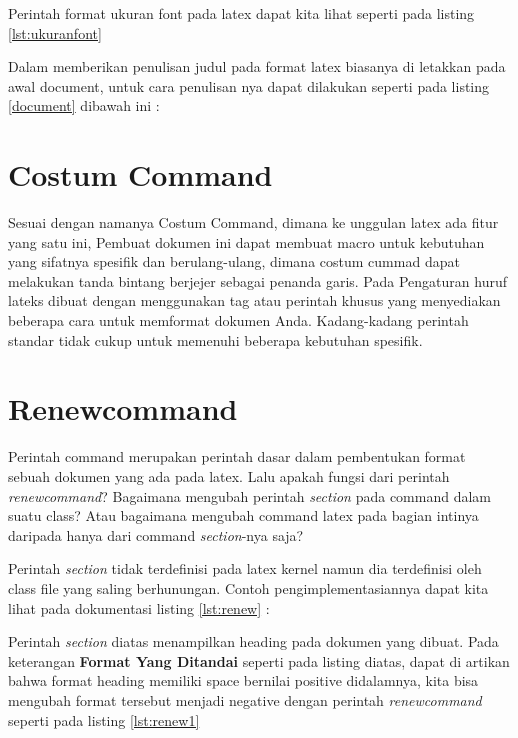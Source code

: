 Perintah format ukuran font pada latex dapat kita lihat seperti pada listing \ref{lst:ukuranfont}



Dalam memberikan penulisan judul pada format latex biasanya di letakkan pada awal document, untuk cara penulisan nya dapat dilakukan seperti pada listing  \ref{document} dibawah ini :



\section{Costum Command}
Sesuai  dengan  namanya Costum Command, dimana ke unggulan latex ada fitur yang satu ini, Pembuat dokumen ini dapat  membuat macro untuk kebutuhan yang sifatnya spesifik dan berulang-ulang, dimana costum cummad dapat melakukan tanda bintang berjejer sebagai penanda garis. Pada Pengaturan huruf lateks dibuat dengan menggunakan tag atau perintah khusus yang menyediakan beberapa cara untuk memformat dokumen Anda. Kadang-kadang perintah standar tidak cukup untuk memenuhi beberapa kebutuhan spesifik.

\section{Renewcommand}
Perintah command merupakan perintah dasar dalam pembentukan format sebuah dokumen yang ada pada latex. Lalu apakah fungsi dari perintah \textit{renewcommand}? Bagaimana mengubah perintah \textit{section} pada command dalam suatu class? Atau bagaimana mengubah command latex pada bagian intinya daripada hanya dari command  \textit{section}-nya saja?

Perintah \textit{section} tidak terdefinisi pada latex kernel namun dia terdefinisi oleh class file yang saling berhunungan. Contoh pengimplementasiannya dapat kita lihat pada dokumentasi listing \ref{lst:renew} :



Perintah \textit{section} diatas menampilkan heading pada dokumen yang dibuat. Pada keterangan \textbf{Format Yang Ditandai} seperti pada listing diatas, dapat di artikan bahwa format heading memiliki space bernilai positive didalamnya, kita bisa mengubah format tersebut menjadi negative dengan perintah \textit{renewcommand} seperti pada listing \ref{lst:renew1} 

